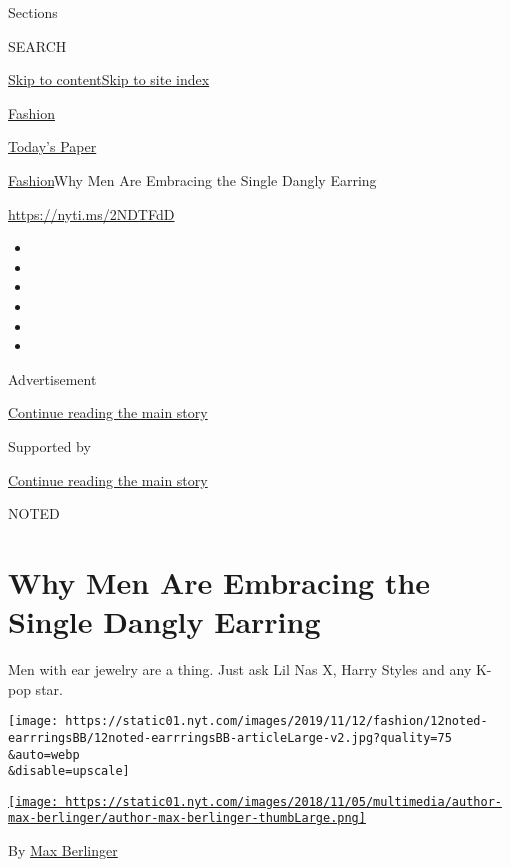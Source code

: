 Sections

SEARCH

\protect\hyperlink{site-content}{Skip to
content}\protect\hyperlink{site-index}{Skip to site index}

\href{https://www.nytimes.com/section/fashion}{Fashion}

\href{https://myaccount.nytimes.com/auth/login?response_type=cookie\&client_id=vi}{}

\href{https://www.nytimes.com/section/todayspaper}{Today's Paper}

\href{/section/fashion}{Fashion}\textbar{}Why Men Are Embracing the
Single Dangly Earring

\href{https://nyti.ms/2NDTFdD}{https://nyti.ms/2NDTFdD}

\begin{itemize}
\item
\item
\item
\item
\item
\item
\end{itemize}

Advertisement

\protect\hyperlink{after-top}{Continue reading the main story}

Supported by

\protect\hyperlink{after-sponsor}{Continue reading the main story}

NOTED

\hypertarget{why-men-are-embracing-the-single-dangly-earring}{%
\section{Why Men Are Embracing the Single Dangly
Earring}\label{why-men-are-embracing-the-single-dangly-earring}}

Men with ear jewelry are a thing. Just ask Lil Nas X, Harry Styles and
any K-pop star.

\texttt{[image: https://static01.nyt.com/images/2019/11/12/fashion/12noted-earrringsBB/12noted-earrringsBB-articleLarge-v2.jpg?quality=75\\\&auto=webp\\\&disable=upscale]}

\href{https://www.nytimes.com/by/max-berlinger}{\texttt{[image: https://static01.nyt.com/images/2018/11/05/multimedia/author-max-berlinger/author-max-berlinger-thumbLarge.png]}}

By \href{https://www.nytimes.com/by/max-berlinger}{Max Berlinger}

